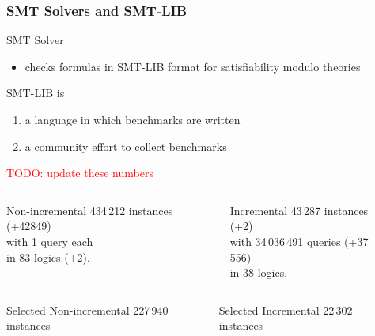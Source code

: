 \documentclass[table]{beamer}
\def\emph#1{\textcolor{MYblue}{#1}}
\begin{document}
\begin{frame}
  \frametitle{SMT Solvers and SMT-LIB}
  SMT Solver
  \begin{itemize}
  \item checks formulas
    in \emph{SMT-LIB} format
    for \emph{satisfiability modulo theories}
  \end{itemize}
  \bigskip

  SMT-LIB is
  \begin{enumerate}
  \item a \emph{language} in which benchmarks are written
  \item a community effort to \emph{collect benchmarks}
  \end{enumerate}
  \medskip
  
  \textcolor{red}{TODO: update these numbers}
  \begin{columns}
    \begin{column}{0.4\textwidth}
      \begin{block}{Non-incremental}
        434\,212 instances {\small (+42849)}\\ %
        with 1 query each \\
        in 83 logics {\small (+2)}.
      \end{block}
    \end{column}
    \begin{column}{0.4\textwidth}
      \begin{block}{Incremental}
        43\,287 instances {\small (+2)}\\
        with 34\,036\,491 queries {\small (+37\,556)} \\ %
        in 38 logics. %
      \end{block}
    \end{column}
    \begin{column}{0.08\textwidth}
    \end{column}
  \end{columns}
  \pause
    \begin{columns}
    \begin{column}{0.4\textwidth}
      \begin{block}{Selected Non-incremental}
        227\,940 instances
      \end{block}
    \end{column}
    \begin{column}{0.4\textwidth}
      \begin{block}{Selected Incremental}
        22\,302 instances
      \end{block}
    \end{column}
    \begin{column}{0.08\textwidth}
    \end{column}
  \end{columns}

\end{frame}
\end{document}
